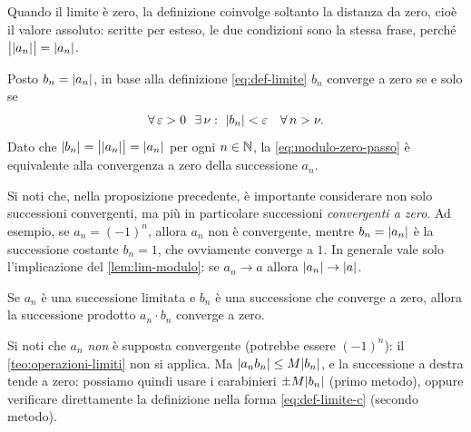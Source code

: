 \begin{schema}
\end{schema}

\begin{strategia}
Quando il limite è zero, la definizione coinvolge soltanto la distanza da zero, cioè il
valore assoluto: scritte per esteso, le due condizioni sono la stessa frase, perché
$\bigl|\lvert a_{n}\rvert\bigr|=\lvert a_{n}\rvert$.
\end{strategia}

\begin{dimostrazione}
Posto $b_{n}=\lvert a_{n}\rvert$, in base alla definizione \eqref{eq:def-limite} $b_{n}$
converge a zero se e solo se
\begin{equation}\label{eq:modulo-zero-passo}
  \forall\,\varepsilon>0\ \ \exists\,\nu :\ \lvert b_{n}\rvert<\varepsilon \quad\forall\, n>\nu .
\end{equation}
Dato che $\lvert b_{n}\rvert=\bigl|\lvert a_{n}\rvert\bigr|=\lvert a_{n}\rvert$ per ogni $n\in\mathbb{N}$, la
\eqref{eq:modulo-zero-passo} è equivalente alla convergenza a zero della successione
$a_{n}$.
\end{dimostrazione}

Si noti che, nella proposizione precedente, è importante considerare non solo
successioni convergenti, ma più in particolare successioni \emph{convergenti a zero}. Ad
esempio, se $a_{n}=(-1)^{n}$, allora $a_{n}$ non è convergente, mentre
$b_{n}=\lvert a_{n}\rvert$ è la successione costante $b_{n}=1$, che ovviamente converge a $1$. In
generale vale solo l'implicazione del \cref{lem:lim-modulo}: se $a_{n}\to a$ allora
$\lvert a_{n}\rvert\to\lvert a\rvert$.

\begin{teorema}\label{teo:limitata-infinitesima}
Se $a_{n}$ è una successione limitata e $b_{n}$ è una successione che converge a zero,
allora la successione prodotto $a_{n}\cdot b_{n}$ converge a zero.
\end{teorema}

\begin{schema}
\end{schema}

\begin{strategia}
Si noti che $a_{n}$ \emph{non} è supposta convergente (potrebbe essere $(-1)^{n}$): il
\cref{teo:operazioni-limiti} non si applica. Ma $\lvert a_{n}b_{n}\rvert\le M\lvert b_{n}\rvert$, e la
successione a destra tende a zero: possiamo quindi usare i carabinieri $\pm M\lvert b_{n}\rvert$
(primo metodo), oppure verificare direttamente la definizione nella forma
\eqref{eq:def-limite-c} (secondo metodo).
\end{strategia}

